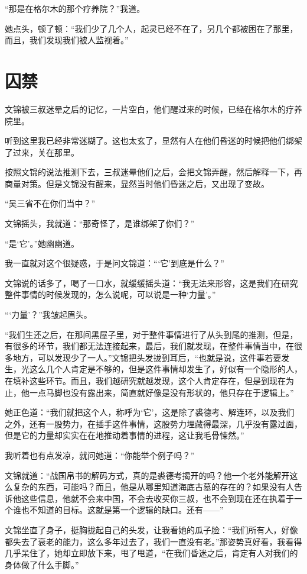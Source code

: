 “那是在格尔木的那个疗养院？”我道。

她点头，顿了顿：“我们少了几个人，起灵已经不在了，另几个都被困在了那里，而且，我们发现我们被人监视着。”

\chapter{囚禁}

文锦被三叔迷晕之后的记忆，一片空白，他们醒过来的时候，已经在格尔木的疗养院里。

听到这里我已经非常迷糊了。这也太玄了，显然有人在他们昏迷的时候把他们绑架了过来，关在那里。

按照文锦的说法推测下去，三叔迷晕他们之后，会把文锦弄醒，然后解释一下，再商量对策。但是文锦没有醒来，显然当时他们昏迷之后，又出现了变故。

“吴三省不在你们当中？”

文锦摇头，我就道：“那奇怪了，是谁绑架了你们？”

“是‘它’。”她幽幽道。

我一直就对这个很疑惑，于是问文锦道：“‘它’到底是什么？”

文锦说的话多了，喝了一口水，就缓缓摇头道：“我无法来形容，这是我们在研究整件事情的时候发现的，怎么说呢，可以说是一种‘力量’。”

“‘力量’？”我皱起眉头。

“我们生还之后，在那间黑屋子里，对于整件事情进行了从头到尾的推测，但是，有很多的环节，我们都无法连接起来，最后，我们就发现，在整件事情当中，在很多地方，可以发现少了一人。”文锦把头发拢到耳后，“也就是说，这件事若要发生，光这么几个人肯定是不够的，但是这件事情却发生了，好似有一个隐形的人，在填补这些环节。而且，我们越研究就越发现，这个人肯定存在，但是到现在为止，他一点马脚也没有露出来，简直就好像是没有形状的，他只存在于逻辑上。”

她正色道：“我们就把这个人，称呼为‘它’，这是除了裘德考、解连环，以及我们之外，还有一股势力，在插手这件事情，这股势力埋藏得最深，几乎没有露过面，但是它的力量却实实在在地推动着事情的进程，这让我毛骨悚然。”

我听着也有点发凉，就问她道：“你能举个例子吗？”

文锦就道：“战国帛书的解码方式，真的是裘德考揭开的吗？他一个老外能解开这么复杂的东西，可能吗？而且，他是从哪里知道海底古墓的存在的？如果没有人告诉他这些信息，他就不会来中国，不会去收买你三叔，也不会到现在还在执着于一个谁也不知道的目标。这就是第一个逻辑的缺口。还有——”

文锦坐直了身子，挺胸拢起自己的头发，让我看她的瓜子脸：“我们所有人，好像都失去了衰老的能力，这么多年过去了，我们一直没有老。”那姿势真好看，我看得几乎呆住了，她却立即放下来，甩了甩道，“在我们昏迷之后，肯定有人对我们的身体做了什么手脚。”


